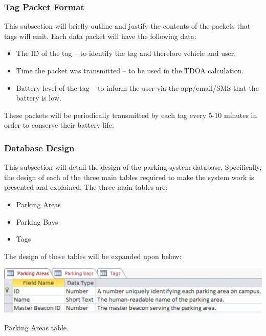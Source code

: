 \subsubsection{Tag Packet Format} \label{tag-packet}
This subsection will briefly outline and justify the contents of the packets that tags will emit. Each data packet will have the following data:

\begin{itemize}
\item The ID of the tag – to identify the tag and therefore vehicle and user.
\item Time the packet was transmitted – to be used in the TDOA calculation.
\item Battery level of the tag – to inform the user via the app/email/SMS that the battery is low.
\end{itemize}

These packets will be periodically transmitted by each tag every 5-10 minutes in order to conserve their battery life.

\subsubsection{Database Design}
This subsection will detail the design of the parking system database. Specifically, the design of each of the three main tables required to make the system work is presented and explained. The three main tables are:

\begin{itemize}
\item Parking Areas
\item Parking Bays
\item Tags
\end{itemize}

The design of these tables will be expanded upon below:

\newpage
{}

\begin{table}[H]
\begin{center}
\includegraphics[scale=0.5]{data/software/5.jpg}
\caption{Parking Areas table.}
\label{tbl:table-parking-areas}
\end{center}
\end{table}

